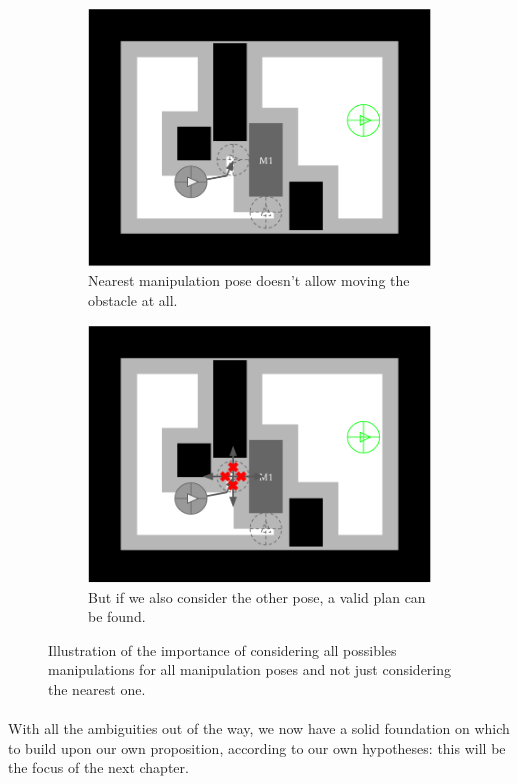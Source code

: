 \begin{figure}[H]
\centering
\begin{subfigure}{.48\textwidth}
  \centering
  \includegraphics[width=\linewidth]{Figures/Manipulation_Pose/manip_pose_1.png}
  \caption{Nearest manipulation pose doesn't allow moving the obstacle at all.}
  \label{fig:manip_pose_2}
\end{subfigure}\hspace*{\fill}
\begin{subfigure}{.48\textwidth}
  \centering
  \includegraphics[width=\linewidth]{Figures/Manipulation_Pose/manip_pose_2.png}
  \caption{But if we also consider the other pose, a valid plan can be found.}
  \label{fig:manip_pose_4}
\end{subfigure}
\caption{Illustration of the importance of considering all possibles manipulations for all manipulation poses and not just considering the nearest one.}
\label{fig:manipulation_poses}
\end{figure}

\paragraph{} With all the ambiguities out of the way, we now have a solid foundation on which to build upon our own proposition, according to our own hypotheses: this will be the focus of the next chapter.
